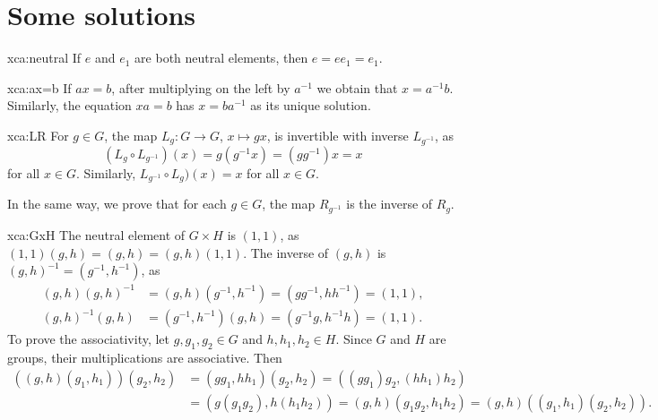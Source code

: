 \section*{Some solutions}

\fancyhf{}
\fancyfoot[R]{\thepage}
\fancyhead[L]{\course}
\setlength{\headheight}{14pt}

\begin{sol}{xca:neutral}
If $e$ and $e_1$ are both neutral elements, then $e=ee_1=e_1$. 
\end{sol}

\begin{sol}{xca:ax=b}
    If $ax=b$, after multiplying on the left by $a^{-1}$ we
    obtain that $x=a^{-1}b$. Similarly, the equation $xa=b$ 
    has $x=ba^{-1}$ as its unique solution. 
\end{sol}

\begin{sol}{xca:LR}
    For $g\in G$, the map $L_g\colon G\to G$, $x\mapsto gx$, is invertible 
    with inverse $L_{g^{-1}}$, as
    \[
    (L_g\circ L_{g^{-1}})(x)=g(g^{-1}x)=(gg^{-1})x=x
    \]
    for all $x\in G$. Similarly, $L_{g^{-1}}\circ L_g)(x)=x$ for all $x\in G$. 
    
    In the same way, we prove that 
    for each $g\in G$, the map $R_{g^{-1}}$ is the inverse of $R_g$. 
\end{sol}

\begin{sol}{xca:GxH}
    The neutral element of $G\times H$ is $(1,1)$, as $(1,1)(g,h)=(g,h)=(g,h)(1,1)$. The inverse
    of $(g,h)$ is $(g,h)^{-1}=(g^{-1},h^{-1})$, as
    \begin{align*}
    (g,h)(g,h)^{-1}&=(g,h)(g^{-1},h^{-1})=(gg^{-1},hh^{-1})=(1,1),\\
    (g,h)^{-1}(g,h)&=(g^{-1},h^{-1})(g,h)=(g^{-1}g,h^{-1}h)=(1,1).
    \end{align*}
    To prove the associativity, let $g,g_1,g_2\in G$ and 
    $h,h_1,h_2\in H$. Since $G$ and $H$ are groups, 
    their multiplications are associative. Then 
    \begin{align*}
        ((g,h)(g_1,h_1))(g_2,h_2) &= (gg_1,hh_1)(g_2,h_2)
        =((gg_1)g_2,(hh_1)h_2)\\
        &= (g(g_1g_2),h(h_1h_2))
        = (g,h)(g_1g_2,h_1h_2)
        = (g,h)((g_1,h_1)(g_2,h_2)).
    \end{align*}
\end{sol}

